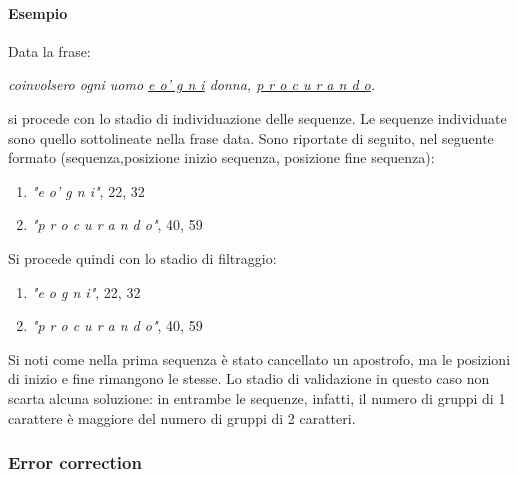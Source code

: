 \paragraph{Esempio}
Data la frase:
\begin{center}
\textit{coinvolsero ogni uomo \ul{e o' g n i} donna, \ul{p r o c u r a n d o}.}
\end{center}
si procede con lo stadio di individuazione delle sequenze. Le sequenze individuate sono quello sottolineate nella frase data. Sono riportate di seguito, nel seguente formato (sequenza,posizione inizio sequenza, posizione fine sequenza):
\begin{enumerate}
\item \textit{"e o' g n i"}, 22, 32
\item \textit{"p r o c u r a n d o"}, 40, 59
\end{enumerate}

Si procede quindi con lo stadio di filtraggio:
\begin{enumerate}
\item \textit{"e o g n i"}, 22, 32
\item \textit{"p r o c u r a n d o"}, 40, 59
\end{enumerate}
Si noti come nella prima sequenza è stato cancellato un apostrofo, ma le posizioni di inizio e fine rimangono le stesse. Lo stadio di validazione in questo caso non scarta alcuna soluzione: in entrambe le sequenze, infatti, il numero di gruppi di 1 carattere è maggiore del numero di gruppi di 2 caratteri.

\subsubsection{Error correction}
\label{sec:met_split_errcor}











